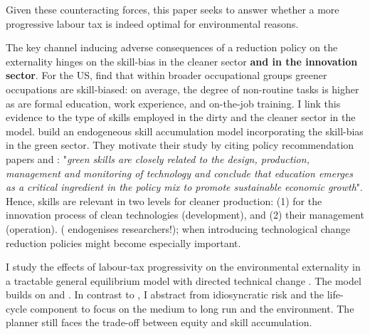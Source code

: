 Given these counteracting forces, this paper seeks to answer whether a more progressive labour tax is indeed optimal for environmental reasons. 

The key channel inducing adverse consequences of a reduction policy on the externality hinges on the skill-bias in the cleaner sector \textbf{and in the innovation sector}. %
For the US, \cite{Consoli2016DoCapital} find that within broader occupational groups greener occupations are skill-biased: on average, the degree of non-routine tasks is higher as are formal education, work experience, and on-the-job training. I link this evidence to the type of skills employed in the dirty and the cleaner sector in the model. %
\cite{Borissov2019CarbonDevelopment}
build an endogeneous skill accumulation model incorporating the skill-bias in the green sector. They motivate their study by citing policy recommendation papers and \cite{Vona2018EnvironmentalExploration}: "\textit{green skills are closely related to the design, production, management and monitoring of technology and conclude that education emerges as a critical ingredient in the policy mix to promote sustainable economic growth}". Hence, skills are relevant in two levels for cleaner production: (1) for the innovation process of clean technologies (development), and (2) their management (operation). (\cite{Fried2018ClimateAnalysis} endogenises researchers!); \ar when introducing technological change reduction policies might become especially important. 

I study the effects of labour-tax progressivity  on the environmental externality in a tractable general equilibrium model with directed technical change . The model builds on \cite{Heathcote2017OptimalFramework} and \cite{Acemoglu2012TheChange}.
In contrast to \cite{Heathcote2017OptimalFramework}, I abstract from idiosyncratic risk and the life-cycle component to focus on the medium to long run and the environment. 
The planner still faces the trade-off between equity and skill accumulation. 

